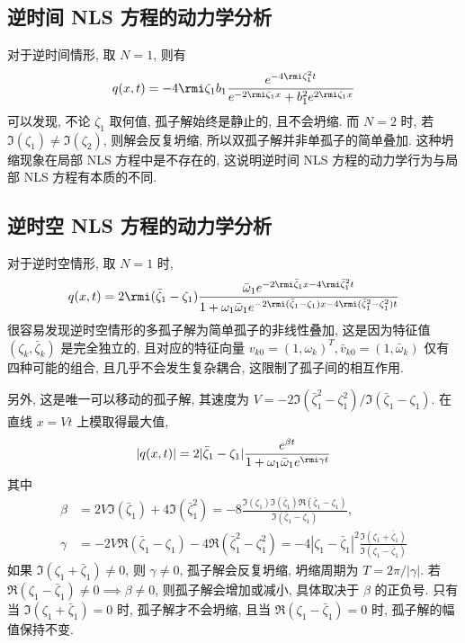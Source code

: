 \subsection{逆时间 NLS 方程的动力学分析}
对于逆时间情形, 取 $ N=1 $, 则有
\begin{equation}
    q(x,t) = -4\rmi \zeta_{1} b_{1} \frac{e^{-4 \rmi \zeta_{1}^{2} t}}{e^{-2 \rmi \zeta_{1}x} + b_{1}^{2} e^{2 \rmi \zeta_{1} x}} \label{ch3-eq-one-soliton-reverse-t-NLS}
\end{equation}
可以发现, 不论 $ \zeta_{1} $ 取何值, 孤子解始终是静止的, 且不会坍缩. 而 $ N=2 $ 时, 若 $\Im(\zeta_{1}) \neq \Im(\zeta_{2})$, 则解会反复坍缩, 所以双孤子解并非单孤子的简单叠加. 这种坍缩现象在局部 NLS 方程中是不存在的, 这说明逆时间 NLS 方程的动力学行为与局部 NLS 方程有本质的不同.
\subsection{逆时空 NLS 方程的动力学分析}
对于逆时空情形, 取 $N=1$ 时,
\begin{equation}
    q(x,t) = 2 \rmi (\bar{\zeta}_{1} - \zeta_{1}) \frac{\bar{\omega}_{1} e^{-2\rmi \bar{\zeta}_{1}x - 4 \rmi \bar{\zeta}_{1}^{2} t}}{1+ \omega_{1} \bar{\omega}_{1}e^{-2 \rmi (\bar{\zeta}_{1} - \zeta_{1}) x - 4 \rmi (\bar{\zeta}_{1}^{2} - \zeta_{1}^{2}) t}} \label{ch3-eq-one-soliton-reverse-x-t-NLS}
\end{equation}
很容易发现逆时空情形的多孤子解为简单孤子的非线性叠加, 这是因为特征值 $(\zeta_{k},\bar{\zeta}_{k})$ 是完全独立的, 且对应的特征向量 $v_{k0} = (1,\omega_{k})^{T}, \bar{v}_{k0} = (1,\bar{\omega}_{k})$ 仅有四种可能的组合, 且几乎不会发生复杂耦合, 这限制了孤子间的相互作用.

另外, 这是唯一可以移动的孤子解, 其速度为 $V = -2 \Im(\bar{\zeta}_{1}^{2}-\zeta_{1}^{2})/\Im(\bar{\zeta}_{1} - \zeta_{1})$. 在直线 $x = Vt$ 上模取得最大值,
\begin{equation}
    |q(x,t)| = 2 |\bar{\zeta}_{1} - \zeta_{1} | \frac{e^{\beta t}}{1+ \omega_{1} \bar{\omega}_{1}e^{\rmi \gamma t}}
\end{equation}
其中
\begin{align}
    \beta  & = 2 V \Im(\bar{\zeta}_{1}) + 4 \Im(\bar{\zeta}_{1}^{2}) = - 8 \frac{\Im(\zeta_{1}) \Im(\bar{\zeta}_{1}) \Re(\bar{\zeta}_{1} - \zeta_{1})}{\Im(\bar{\zeta}_{1} - \zeta_{1})}, \label{ch3-eq-beta}                           \\
    \gamma & = -2 V \Re(\bar{\zeta}_{1} - \zeta_{1}) - 4 \Re(\bar{\zeta}_{1}^{2} - \zeta_{1}^{2}) = -4 |\zeta_{1} - \bar{\zeta}_{1}|^{2} \frac{\Im(\zeta_{1} + \bar{\zeta}_{1})}{\Im(\zeta_{1} - \bar{\zeta}_{1})} \label{ch3-eq-gamma}
\end{align}
如果 $\Im(\zeta_{1} + \bar{\zeta}_{1}) \neq 0 $, 则 $\gamma \neq 0$, 孤子解会反复坍缩, 坍缩周期为 $ T = 2 \pi/|\gamma|$. 若 $\Re(\zeta_{1} - \bar{\zeta}_{1}) \neq 0 \implies \beta \neq 0 $, 则孤子解会增加或减小, 具体取决于 $\beta$ 的正负号. 只有当 $\Im(\zeta_{1} + \bar{\zeta}_{1}) = 0 $ 时, 孤子解才不会坍缩, 且当 $\Re(\zeta_{1} - \bar{\zeta}_{1}) = 0 $ 时, 孤子解的幅值保持不变.
